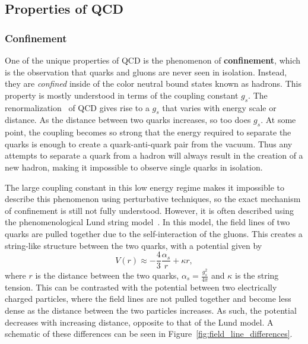 \subsection{Properties of QCD}
\label{sec:qcd_properties}

\subsubsection{Confinement}
\label{sec:qcd_confinement}

One of the unique properties of QCD is the phenomenon of \textbf{confinement}, which is the observation that quarks and gluons are never seen in isolation. Instead, they are \textit{confined} inside of the color neutral bound states known as hadrons. This property is mostly understood in terms of the coupling constant $g_{s}$. The renormalization~\cite{QCDRenorm} of QCD gives rise to a $g_{s}$ that varies with energy scale or distance. As the distance between two quarks increases, so too does $g_{s}$. At some point, the coupling becomes so strong that the energy required to separate the quarks is enough to create a quark-anti-quark pair from the vacuum. Thus any attempts to separate a quark from a hadron will always result in the creation of a new hadron, making it impossible to observe single quarks in isolation. 

The large coupling constant in this low energy regime makes it impossible to describe this phenomenon using perturbative techniques, so the exact mechanism of confinement is still not fully understood. However, it is often described using the phenomenological Lund string model~\cite{LundString}. In this model, the field lines of two quarks are pulled together due to the self-interaction of the gluons. This creates a string-like structure between the two quarks, with a potential given by 
%
\begin{equation}
    \label{eq:lund_potential}
    V(r) \approx -\frac{4}{3}\frac{\alpha_s}{r} + \kappa r,
\end{equation}
%
where $r$ is the distance between the two quarks, $\alpha_s = \frac{g_s^2}{4\pi}$ and $\kappa$ is the string tension. This can be contrasted with the potential between two electrically charged particles, where the field lines are not pulled together and become less dense as the distance between the two particles increases. As such, the potential decreases with increasing distance, opposite to that of the Lund model. A schematic of these differences can be seen in Figure~\ref{fig:field_line_differences}.

